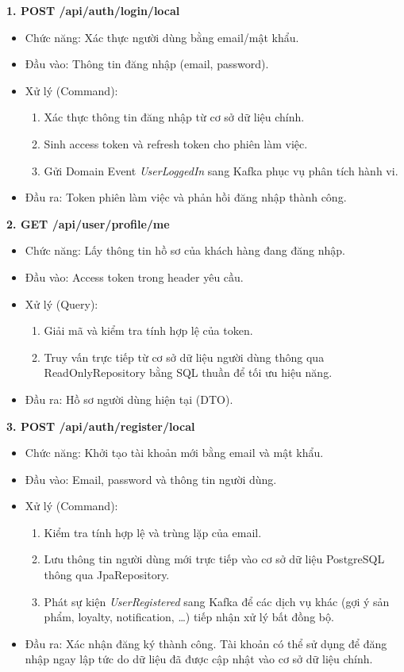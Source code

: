 \textbf{1. POST /api/auth/login/local}
\begin{itemize}
    \item Chức năng: Xác thực người dùng bằng email/mật khẩu.
    \item Đầu vào: Thông tin đăng nhập (email, password).
    \item Xử lý (Command):
    \begin{enumerate} 
        \item Xác thực thông tin đăng nhập từ cơ sở dữ liệu chính. 
        \item Sinh access token và refresh token cho phiên làm việc. 
        \item Gửi Domain Event \textit{UserLoggedIn} sang Kafka phục vụ phân tích hành vi. 
    \end{enumerate}
    \item Đầu ra: Token phiên làm việc và phản hồi đăng nhập thành công.
\end{itemize}

\textbf{2. GET /api/user/profile/me}
\begin{itemize}
    \item Chức năng: Lấy thông tin hồ sơ của khách hàng đang đăng nhập.
    \item Đầu vào: Access token trong header yêu cầu.
    \item Xử lý (Query):
    \begin{enumerate} 
        \item Giải mã và kiểm tra tính hợp lệ của token. 
        \item Truy vấn trực tiếp từ cơ sở dữ liệu người dùng thông qua ReadOnlyRepository bằng SQL thuần để tối ưu hiệu năng. 
    \end{enumerate}
    \item Đầu ra: Hồ sơ người dùng hiện tại (DTO).
\end{itemize}

\textbf{3. POST /api/auth/register/local}
\begin{itemize}
    \item Chức năng: Khởi tạo tài khoản mới bằng email và mật khẩu.
    \item Đầu vào: Email, password và thông tin người dùng.
    \item Xử lý (Command):
    \begin{enumerate}
        \item Kiểm tra tính hợp lệ và trùng lặp của email.
        \item Lưu thông tin người dùng mới trực tiếp vào cơ sở dữ liệu PostgreSQL thông qua JpaRepository.
        \item Phát sự kiện \textit{UserRegistered} sang Kafka để các dịch vụ khác (gợi ý sản phẩm, loyalty, notification, \dots) tiếp nhận xử lý bất đồng bộ.
    \end{enumerate}
    \item Đầu ra: Xác nhận đăng ký thành công. Tài khoản có thể sử dụng để đăng nhập ngay lập tức do dữ liệu đã được cập nhật vào cơ sở dữ liệu chính.
\end{itemize}

